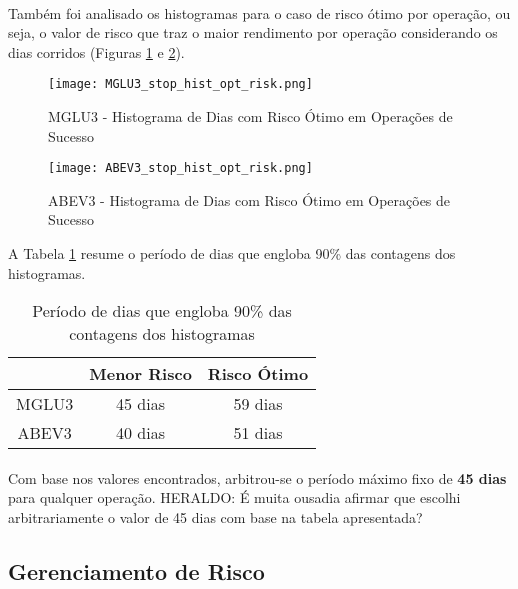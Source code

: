 \paragraph{} Também foi analisado os histogramas para o caso de risco ótimo por operação, ou seja, o valor de risco que traz o maior rendimento por operação considerando os dias corridos (Figuras \ref{fig:122} e \ref{fig:123}).

\begin{figure}[h]
    \texttt{[image: MGLU3\_stop\_hist\_opt\_risk.png]}
    \centering
    \caption{MGLU3 - Histograma de Dias com Risco Ótimo em Operações de Sucesso}
    \label{fig:122}
\end{figure}

\begin{figure}[h]
    \texttt{[image: ABEV3\_stop\_hist\_opt\_risk.png]}
    \centering
    \caption{ABEV3 - Histograma de Dias com Risco Ótimo em Operações de Sucesso}
    \label{fig:123}
\end{figure}

A Tabela \ref{tab:4} resume o período de dias que engloba 90\% das contagens dos histogramas.

\begin{table}[h!]
    \begin{center}
        \begin{tabular}{ c|cc }
            & Menor Risco & Risco Ótimo \\
            \hline
            MGLU3 & 45 dias & 59 dias \\
            ABEV3 & 40 dias & 51 dias \\
        \end{tabular}
        \caption{Período de dias que engloba 90\% das contagens dos histogramas}
        \label{tab:4}
    \end{center}
\end{table}

\paragraph{} Com base nos valores encontrados, arbitrou-se o período máximo fixo de \textbf{45 dias} para qualquer operação. \color{red} HERALDO: É muita ousadia afirmar que escolhi arbitrariamente o valor de 45 dias com base na tabela apresentada? 


\subsection{Gerenciamento de Risco}
\label{sub:risk_man}

